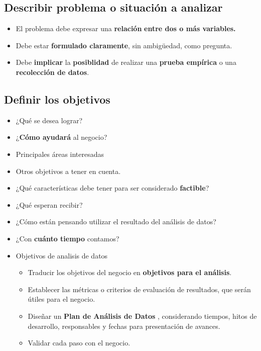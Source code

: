 \documentclass[
]{book}
\providecommand{\tightlist}{%
  \setlength{\itemsep}{0pt}\setlength{\parskip}{0pt}}
\begin{document}
\hypertarget{describir-problema-o-situaciuxf3n-a-analizar}{%
\subsection{Describir problema o situación a analizar}\label{describir-problema-o-situaciuxf3n-a-analizar}}

\begin{itemize}
\tightlist
\item
  El problema debe expresar una \textbf{relación}
  \textbf{entre dos o más variables.}
\item
  Debe estar \textbf{formulado claramente},
  sin ambigüedad, como pregunta.
\item
  Debe \textbf{implicar} la \textbf{posiblidad} de realizar
  una \textbf{prueba empírica} o una
  \textbf{recolección de datos}.
\end{itemize}

\hypertarget{definir-los-objetivos}{%
\subsection{Definir los objetivos}\label{definir-los-objetivos}}

\begin{itemize}
\item
  ¿Qué se desea lograr?
\item
  ¿\textbf{Cómo ayudará} al negocio?
\item
  Principales áreas interesadas
\item
  Otros objetivos a tener en cuenta.
\item
  ¿Qué características debe tener
  para ser considerado \textbf{factible}?
\item
  ¿Qué esperan recibir?
\item
  ¿Cómo están pensando utilizar el
  resultado del análisis de datos?
\item
  ¿Con \textbf{cuánto tiempo} contamos?
\item
  Objetivos de analisis de datos

  \begin{itemize}
  \tightlist
  \item
    Traducir los objetivos del
    negocio en \textbf{objetivos para el análisis}.
  \item
    Establecer las métricas o criterios de
    evaluación de resultados, que serán
    útiles para el negocio.
  \item
    Diseñar un \textbf{Plan de Análisis de Datos}
    , considerando tiempos, hitos de desarrollo,
    responsables y fechas para presentación
    de avances.
  \item
    Validar cada paso con el negocio.
  \end{itemize}
\end{itemize}
\end{document}

